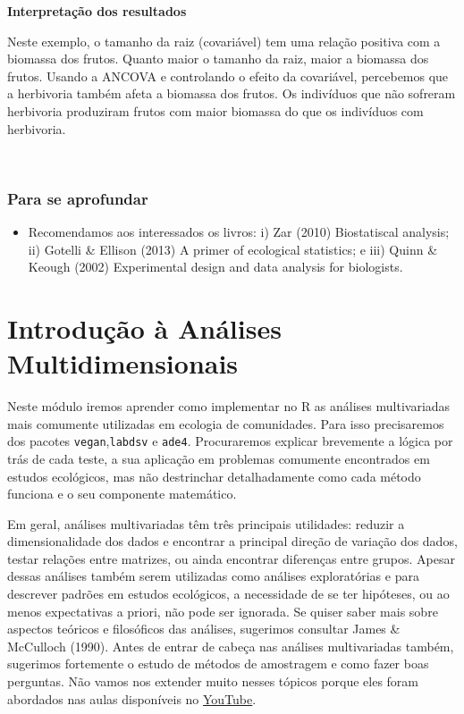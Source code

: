 \documentclass[
]{book}
\providecommand{\tightlist}{%
  \setlength{\itemsep}{0pt}\setlength{\parskip}{0pt}}
\begin{document}
\textbf{Interpretação dos resultados}

Neste exemplo, o tamanho da raiz (covariável) tem uma relação positiva com a biomassa dos frutos. Quanto maior o tamanho da raiz, maior a biomassa dos frutos. Usando a ANCOVA e controlando o efeito da covariável, percebemos que a herbivoria também afeta a biomassa dos frutos. Os indivíduos que não sofreram herbivoria produziram frutos com maior biomassa do que os indivíduos com herbivoria.

~

\hypertarget{para-se-aprofundar}{%
\subsection{Para se aprofundar}\label{para-se-aprofundar}}

\begin{itemize}
\tightlist
\item
  Recomendamos aos interessados os livros: i) Zar (2010) Biostatiscal analysis; ii) Gotelli \& Ellison (2013) A primer of ecological statistics; e iii) Quinn \& Keough (2002) Experimental design and data analysis for biologists.
\end{itemize}

\hypertarget{introduuxe7uxe3o-uxe0-anuxe1lises-multidimensionais}{%
\chapter{Introdução à Análises Multidimensionais}\label{introduuxe7uxe3o-uxe0-anuxe1lises-multidimensionais}}

Neste módulo iremos aprender como implementar no R as análises multivariadas mais comumente utilizadas em ecologia de comunidades. Para isso precisaremos dos pacotes \texttt{vegan},\texttt{labdsv} e \texttt{ade4}. Procuraremos explicar brevemente a lógica por trás de cada teste, a sua aplicação em problemas comumente encontrados em estudos ecológicos, mas não destrinchar detalhadamente como cada método funciona e o seu componente matemático.

Em geral, análises multivariadas têm três principais utilidades: reduzir a dimensionalidade dos dados e encontrar a principal direção de variação dos dados, testar relações entre matrizes, ou ainda encontrar diferenças entre grupos. Apesar dessas análises também serem utilizadas como análises exploratórias e para descrever padrões em estudos ecológicos, a necessidade de se ter hipóteses, ou ao menos expectativas a priori, não pode ser ignorada. Se quiser saber mais sobre aspectos teóricos e filosóficos das análises, sugerimos consultar James \& McCulloch (1990). Antes de entrar de cabeça nas análises multivariadas também, sugerimos fortemente o estudo de métodos de amostragem e como fazer boas perguntas. Não vamos nos extender muito nesses tópicos porque eles foram abordados nas aulas disponíveis no \href{https://www.youtube.com/playlist?list=PLy2rjqiD2VP5G6pqMo_QlWo7I3yu-uFTk}{YouTube}.
\end{document}

